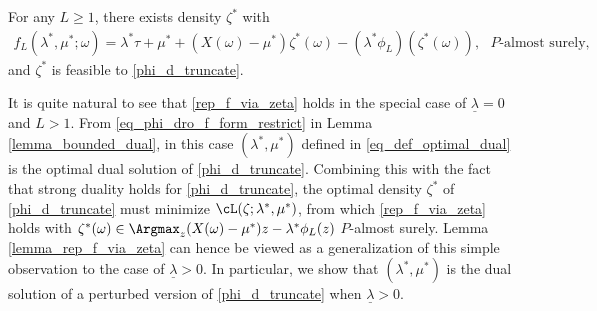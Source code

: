 \documentclass[9pt]{article} %
\numberwithin{equation}{section}
\begin{document}
\begin{lemma}\label{lemma_rep_f_via_zeta}
For any $L \geq 1$, there exists density $\zeta^*$ with 
\begin{align}\label{rep_f_via_zeta}
f_L(\lambda^*, \mu^*; \omega) 
= \lambda^* \tau + \mu^* + (X(\omega) - \mu^*) \zeta^*(\omega) - (\lambda^* \phi_L)(\zeta^*(\omega)), ~~~ \text{$P$-almost surely},
\end{align}
and $\zeta^*$ is feasible to \eqref{phi_d_truncate}.
\end{lemma}

\begin{remark}
It is quite natural to see that \eqref{rep_f_via_zeta} holds in the special case of $\underline{\lambda} = 0$ and $L > 1$. 
From \eqref{eq_phi_dro_f_form_restrict} in Lemma \ref{lemma_bounded_dual}, in this case $(\lambda^*, \mu^*)$ defined in \eqref{eq_def_optimal_dual}  is the optimal dual solution of \eqref{phi_d_truncate}.
Combining this with the fact that strong duality holds for \eqref{phi_d_truncate}, the optimal density $\zeta^*$  of \eqref{phi_d_truncate} must minimize $\cL(\zeta; \lambda^*, \mu^*)$,  from which \eqref{rep_f_via_zeta} holds with $\zeta^*(\omega) \in \Argmax_{z} (X(\omega) - \mu^*) z - \lambda^* \phi_L(z)$ $P$-almost surely. 
Lemma \ref{lemma_rep_f_via_zeta}  can hence be viewed as a generalization of this simple observation to the case of $\underline{\lambda} > 0$. 
In particular, we show that  $(\lambda^*, \mu^*)$ is the dual solution of a perturbed version of \eqref{phi_d_truncate} when $\underline{\lambda} > 0$.
\end{remark} 
\end{document}
